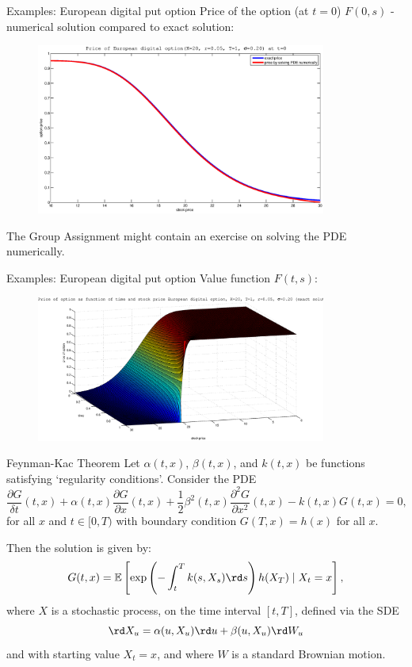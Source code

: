\documentclass[pdf, handout]{beamer}
\begin{document}
\begin{frame}{Examples: European digital put option}
Price of the option (at $t=0$) $F(0,s)$ - numerical solution compared to exact solution:
\begin{figure}
\includegraphics[width=0.85\textwidth]{startprice_dig_put.eps}
\end{figure}
The Group Assignment might contain an exercise on solving the PDE numerically.
\end{frame}

\begin{frame}{Examples: European digital put option}
Value function $F(t,s)$:
\begin{figure}
\includegraphics[width=0.85\textwidth]{value_dig_put.eps}
\end{figure}
\end{frame}

\begin{frame}{Feynman-Kac Theorem}
Let $\alpha(t, x)$, $\beta(t,x)$, and $k(t,x)$ be  functions satisfying `regularity conditions'.
Consider the PDE
\[
\frac{\partial G}{\delta t}(t, x) +  \alpha(t, x) \frac{\partial G}{\partial
x}(t, x) + \frac{1}{2} \beta^2(t,x)  \frac{\partial^2 G}{\partial
x^2}(t,x) - k(t, x)  G(t,x )=0, 
\]
for all $x$ and 
$t\in[0, T)$ with boundary condition $G(T, x) = h(x)$ for all $x$.  

Then the solution is given by:
\[
G(t,x)= \mathbb{E}\left[ 
 \exp\left( -  \int_t^T k(s, X_s) \rd s  \right) h( X_T)
\mid X_t=x
\right],
\]
where $X$ is a stochastic process, on the time interval $[t, T]$, defined via the SDE
\[
\rd X_u = \alpha(u,X_u) \rd u + \beta(u, X_u) \rd W_u
\]
and with starting value $X_t=x$, and
where $W$ is a standard Brownian motion.
\end{frame}
\end{document}
